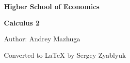 \begin{titlepage}
\centering
\vspace*{0.16\textheight}
{\Large\bfseries Higher School of Economics\par}
\vspace{2.2cm}
{\Huge\bfseries Calculus 2\par}
\vspace{1.4cm}
{\Large Author: Andrey Mazhuga\par}
\vfill
{\small Converted to LaTeX by Sergey Zyablyuk\par}
\vspace*{0.08\textheight}
\end{titlepage}
